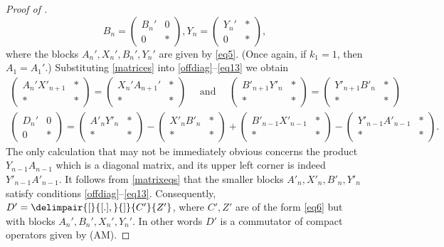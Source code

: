 \documentclass[10pt,reqno]{amsart}
\theoremstyle{remark}
\newcommand{\comm}{\delimpair{[}{[.],}{]}}
\numberwithin{equation}{section}
\begin{document}
\begin{proof}[Proof of ]
\begin{equation}
    B_n=\begin{pmatrix} B_n' & 0\\ 0 & \ast\end{pmatrix},
    Y_n=\begin{pmatrix} Y_n' & \ast\\ 0 & \ast\end{pmatrix},
  \end{equation}
  where the blocks $A_n',X_n',B_n',Y_n'$ are given by \eqref{eq5}.
  (Once again, if $k_1=1$, then $A_1=A_1'$.)
  Substituting \eqref{matrices} into \eqref{offdiag}--\eqref{eq13} we obtain
  \begin{equation}
    \label{matrixeqs}
    \begin{gathered}
      \begin{pmatrix} A_{n}'X'_{n+1} & \ast\\ \ast & \ast\end{pmatrix}=\begin{pmatrix} X_n'A_{n+1}' & \ast\\ \ast & \ast\end{pmatrix}\quad\mbox{ and }\quad
      \begin{pmatrix} B'_{n+1}Y'_{n} & \ast\\ \ast & \ast\end{pmatrix}=\begin{pmatrix} Y'_{n+1}B'_n & \ast\\ \ast & \ast\end{pmatrix}\\
      \begin{pmatrix} D_n' &0\\0& \ast\end{pmatrix}=\begin{pmatrix} A'_{n}Y'_{n} & \ast\\ \ast & \ast\end{pmatrix}-\begin{pmatrix} X'_{n}B'_{n} & \ast\\ \ast & \ast\end{pmatrix}+\begin{pmatrix} B'_{n-1}X'_{n-1} & \ast\\ \ast & \ast\end{pmatrix}-\begin{pmatrix} Y'_{n-1}A'_{n-1} & \ast\\ \ast & \ast\end{pmatrix}.
    \end{gathered}
  \end{equation}
  The only calculation that may not be immediately obvious concerns the product $Y_{n-1}A_{n-1}$ which is a diagonal matrix, and its upper left corner is indeed $Y'_{n-1}A'_{n-1}$.
  It follows from \eqref{matrixeqs} that the smaller blocks $A'_n,X'_n,B'_n,Y'_n$ satisfy conditions \eqref{offdiag}--\eqref{eq13}.
  Consequently, $D'=\comm{C'}{Z'}$, where $C',Z'$ are of the form \eqref{eq6} but with blocks $A_n',B_n',X_n',Y_n'$.
  In other words $D'$ is a commutator of compact operators given by (AM).
\end{proof}
\end{document}
